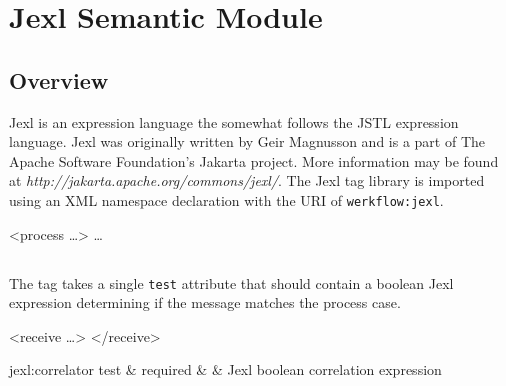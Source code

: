 \chapter{Jexl Semantic Module}

\section{Overview}

Jexl is an expression language the somewhat follows the JSTL
expression language.  Jexl was originally written by Geir
Magnusson and is a part of The Apache Software Foundation's 
Jakarta project.  More information may be found at
\emph{http://jakarta.apache.org/commons/jexl/}.
The Jexl tag library is imported using an XML namespace
declaration with the URI of \verb|werkflow:jexl|.

\begin{codelisting}
<process  \dots>
    \dots
\end{codelisting}



\section{}

The  tag takes a single \verb|test| attribute
that should contain a boolean Jexl expression determining if
the message matches the process case.

\begin{codelisting}
<receive \dots>
</receive>
\end{codelisting}

\begin{attrDefs}{jexl:correlator}
test		&	required	&			& Jexl boolean correlation expression \\
\end{attrDefs}
